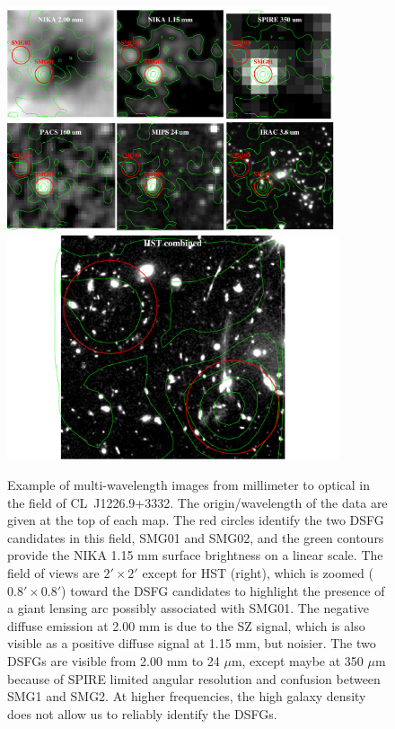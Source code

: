 \documentclass[11pt,a4paper,twoside,graphicx,color]{article}
\begin{document}
\begin{figure}[h!]
	\centering
	\includegraphics[trim=0cm 0cm 0cm 0.5cm, clip=true, height=6.6cm]{CLJ1227_multiL.pdf}
	\includegraphics[trim=4.9cm 0cm 4.9cm 0cm, clip=true, height=6.6cm]{CLJ1227_HST.pdf}
	\caption{\footnotesize{Example of multi-wavelength images from millimeter to optical in the field of \mbox{CL~J1226.9+3332}. The origin/wavelength of the data are given at the top of each map. The red circles identify the two DSFG candidates in this field, SMG01 and SMG02, and the green contours provide the NIKA 1.15 mm surface brightness on a linear scale. The field of views are $2' \times 2'$ except for HST (right), which is zoomed ($0.8' \times 0.8'$) toward the DSFG candidates to highlight the presence of a giant lensing arc possibly associated with SMG01. The negative diffuse emission at 2.00 mm is due to the SZ signal, which is also visible as a positive diffuse signal at 1.15 mm, but noisier. The two DSFGs are visible from 2.00 mm to 24 $\mu$m, except maybe at 350 $\mu$m because of SPIRE limited angular resolution and confusion between SMG1 and SMG2. At higher frequencies, the high galaxy density does not allow us to reliably identify the DSFGs.}}
	\label{fig:maps2} 
\end{figure}
\end{document}
